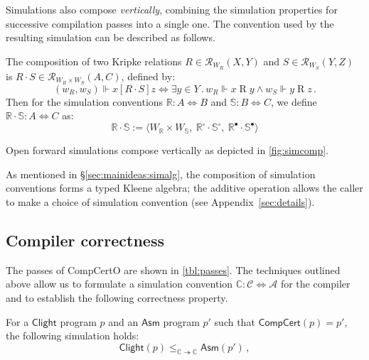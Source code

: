 \documentclass[sigplan,10pt,review]{acmart}
\newcommand{\kw}[1]{\ensuremath{ \mathsf{#1} }}
\newcommand{\ifr}[1]{\mathrel{[{#1}]}}
\newcommand{\que}{\circ}
\newcommand{\ans}{\bullet}
\begin{document}
Simulations also compose \emph{vertically},
combining the
simulation properties for successive compilation passes
into a single one.
The convention used by the resulting simulation
can be described as follows.

\begin{definition} %
The composition of two Kripke relations
$R \in \mathcal{R}_{W_R}(X, Y)$ and
$S \in \mathcal{R}_{W_S}(Y, Z)$
is %
$R \cdot S \in \mathcal{R}_{W_R \times W_S}(A, C)$,
defined by:
\[
  (w_R, w_S) \Vdash x \ifr{R \cdot S} z \Leftrightarrow
  \exists y \in Y \,.\,
    w_R \Vdash x \mathrel{R} y \wedge
    w_S \Vdash y \mathrel{R} z \,.
\]
Then for the simulation conventions
$\mathbb{R} : A \Leftrightarrow B$ and
$\mathbb{S} : B \Leftrightarrow C$,
we define
$\mathbb{R} \cdot \mathbb{S} : A \Leftrightarrow C$ as:
\[
  \mathbb{R} \cdot \mathbb{S} :=
  \langle
    W_\mathbb{R} \times W_\mathbb{S}, \:
    \mathbb{R}^\que \cdot \mathbb{S}^\que, \:
    \mathbb{R}^\ans \cdot \mathbb{S}^\ans
  \rangle
\]
\end{definition}

\begin{theorem} \label{thm:fsim-vcomp} %
Open forward simulations compose vertically
as depicted in \autoref{fig:simcomp}.
\end{theorem}

As mentioned in \S\ref{sec:mainideas:simalg},
the composition of simulation conventions
forms a typed Kleene algebra;
the additive operation
allows the caller to make a choice of simulation convention
(see Appendix~\ref{sec:details}).



\subsection{Compiler correctness} \label{sec:comppass} %

The passes of CompCertO are shown in \autoref{tbl:passes}.
The techniques outlined above allow us to formulate
a simulation convention
$\mathbb{C} : \mathcal{C} \Leftrightarrow \mathcal{A}$
for the compiler %
and to establish the following correctness property.

\begin{theorem} \label{thm:compc} %
For a \kw{Clight} program $p$
and an \kw{Asm} program $p'$ such that
$\kw{CompCert}(p) = p'$,
the following simulation holds:
\[
    \kw{Clight}(p) \le_{\mathbb{C} \twoheadrightarrow \mathbb{C}}
    \kw{Asm}(p') \,,
\]
\end{theorem}
\end{document}
